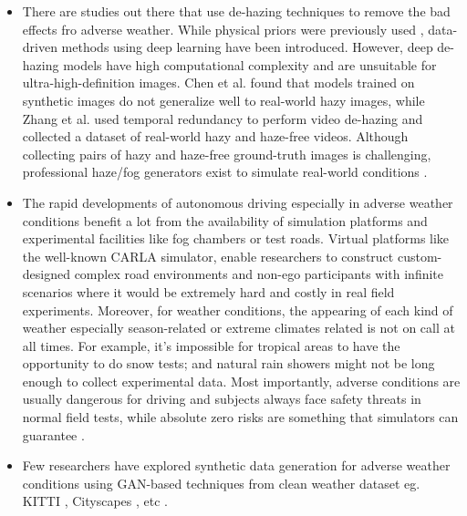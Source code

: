 \documentclass[rnd]{mas_proposal}
\begin{document}
\begin{itemize}
    \item There are studies out there that use de-hazing techniques to remove the bad effects fro adverse weather. While physical priors were previously used \cite{tan2008visibility} \cite{tarel2009fast}, data-driven methods using deep learning have been introduced. However, deep de-hazing models have high computational complexity and are unsuitable for ultra-high-definition images. Chen et al. \cite{chen2021psd} found that models trained on synthetic images do not generalize well to real-world hazy images, while Zhang et al. \cite{zhang2021learning} used temporal redundancy to perform video de-hazing and collected a dataset of real-world hazy and haze-free videos. Although collecting pairs of hazy and haze-free ground-truth images is challenging, professional haze/fog generators exist to simulate real-world conditions \cite{musat2021multi} \cite{timofte2018ntire}.

    \item The rapid developments of autonomous driving especially in adverse weather conditions benefit a lot from the availability of simulation platforms and experimental facilities like fog chambers or test roads. Virtual platforms like the well-known CARLA \cite{dosovitskiy2017carla} simulator, enable researchers to construct custom-designed complex road environments and non-ego participants with infinite scenarios where it would be extremely hard and costly in real field experiments. Moreover, for weather conditions, the appearing of each kind of weather especially season-related or extreme climates related is not on call at all times. For example, it’s impossible for tropical areas to have the opportunity to do snow tests; and natural rain showers might not be long enough to collect experimental data. Most importantly, adverse conditions are usually dangerous for driving and subjects always face safety threats in normal field tests, while absolute zero risks are something that simulators can guarantee \cite{Zhang2021Dec}.

    \item Few researchers have explored synthetic data generation for adverse weather conditions using GAN-based techniques from clean weather dataset eg. KITTI \cite{geiger2012we}, Cityscapes \cite{cordts2016cityscapes}, etc \cite{sun2021multi} \cite{zheng2020forkgan} \cite{lee2022perception}.


\end{itemize}
\end{document}
